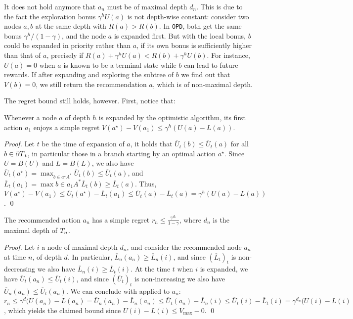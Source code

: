 \documentclass[runningheads]{llncs}
\begin{document}
\begin{remark}
It does not hold anymore that $a_n$ must be of maximal depth $d_n$.  This is due to the fact the exploration bonus $\gamma^h U(a)$ is not depth-wise constant: consider two nodes $a,b$ at the same depth with $R(a) > R(b)$. In \texttt{OPD}, both get the same bonus $\gamma^h/(1-\gamma)$, and the node $a$ is expanded first. But with the local bonus, $b$ could be expanded in priority rather than $a$, if its own bonus is sufficiently higher than that of $a$, precisely if $R(a)+\gamma^h U(a) < R(b)+\gamma^h U(b)$. For instance, $U(a)=0$ when $a$ is known to be a terminal state while $b$ can lead to future rewards. If after expanding and exploring the subtree of $b$ we find out that $V(b) = 0$, we still return the recommendation $a$, which is of non-maximal depth.
\end{remark}

The regret bound still holds, however. First, notice that:
\begin{lemma}
\label{lemma:expansion-bound}
Whenever a node $a$ of depth $h$ is expanded by the optimistic algorithm, its first action $a_1$ enjoys a simple regret $V(a^\star)-V(a_1) \leq \gamma^h(U(a)-L(a))$. 
\end{lemma}
\begin{proof}
Let $t$ be the time of expansion of $a$, it holds that $\overline{U}_t(b) \leq \overline{U}_t(a)$ for all $b\in {\partial T}_t$, in particular those in a branch starting by an optimal action $a^\star$. Since $U=B(U)$ and $L=B(L)$, we also have $\overline{U}_t(a^\star) = \max_{b\in a^\star A^*} \overline{U}_t(b) \leq \overline{U}_t(a)$, and $\overline{L}_t(a_1) = \max{b\in a_1 A^*} \overline{L}_t(b) \geq  \overline{L}_t(a)$. Thus, $V(a^\star)-V(a_1) \leq \overline{U}_t(a^\star) - \overline{L}_t(a_1) \leq \overline{U}_t(a) - \overline{L}_t(a) = \gamma^h(U(a)-L(a))$.
\qed\end{proof}
 
\begin{lemma}
	\label{lem:regret-depth}
The recommended action $a_n$ has a simple regret $r_n \leq \frac{\gamma^{d_n}}{1-\gamma}$, where $d_n$ is the maximal depth of $T_n$.
\end{lemma}
\begin{proof}
Let $i$ a node of maximal depth $d_n$, and consider the recommended node $a_n$ at time $n$, of depth $d$. In particular, $\overline{L}_n(a_n) \geq \overline{L}_n(i)$, and since $(\overline{L}_t)_t$ is non-decreasing we also have $\overline{L}_n(i) \geq \overline{L}_t(i)$. At the time $t$ when $i$ is expanded, we have $\overline{U}_t(a_n) \leq \overline{U}_t(i)$, and since $(\overline{U}_t)_t$ is non-increasing we also have $\overline{U}_n(a_n) \leq \overline{U}_t(a_n)$. We can conclude with  applied to $a_n$: $r_n \leq \gamma^d(U(a_n)-L(a_n) = \overline{U}_n(a_n) - \overline{L}_n(a_n)  \leq \overline{U}_t(a_n) - \overline{L}_n(i) \leq \overline{U}_t(i) - \overline{L}_t(i) = \gamma^{d_n}(U(i) - L(i)$, which yields the claimed bound since $U(i) - L(i) \leq V_{\max}-0$.
\qed\end{proof}
\end{document}
